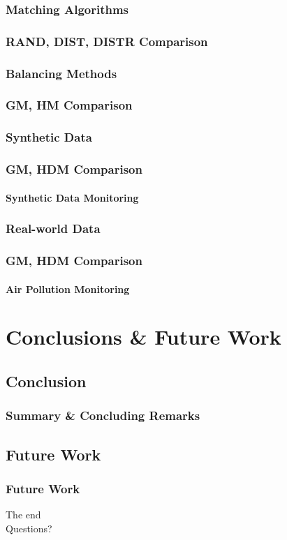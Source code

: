 \documentclass[hyperref={pdfpagelabels=false}]{beamer}
\begin{document}
\subsubsection*{ Matching Algorithms}
\begin{frame} \frametitle{RAND, DIST, DISTR Comparison}

\end{frame}
\subsubsection*{Balancing Methods}
\begin{frame} \frametitle{GM, HM Comparison}

\end{frame}
\subsubsection*{Synthetic Data}
\begin{frame} \frametitle{GM, HDM Comparison}\framesubtitle{Synthetic Data Monitoring}

\end{frame}
\subsubsection*{Real-world Data}
\begin{frame} \frametitle{GM, HDM Comparison}\framesubtitle{Air Pollution Monitoring}

\end{frame}
\section{Conclusions \& Future Work}
\subsection{Conclusion}
\begin{frame} \frametitle{Summary \& Concluding Remarks}

\end{frame}
\subsection{Future Work}
\begin{frame} \frametitle{Future Work}

\end{frame}

\begin{frame}[plain]
\centering
The end\\
Questions?
\end{frame}
\end{document}
